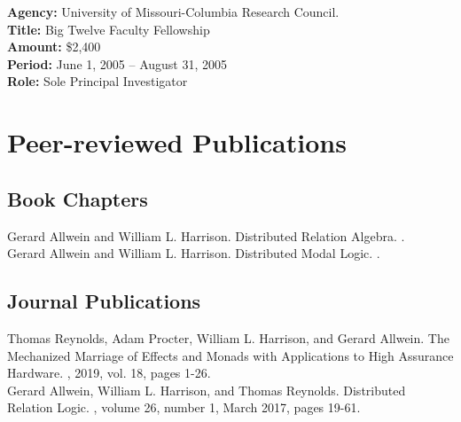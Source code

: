 \documentclass[12pt]{article} %
\begin{document}
{\bf Agency:} University of Missouri-Columbia Research Council.
\\
{\bf Title:} Big Twelve Faculty Fellowship
\\
{\bf Amount:} \$2,400
\\
{\bf Period:}   June 1, 2005  --  August 31, 2005 
\\
{\bf Role:}      Sole Principal Investigator
\\


\section*{Peer-reviewed Publications}

\subsection*{Book Chapters}

Gerard Allwein and William L. Harrison.
\newblock Distributed Relation Algebra.
.
\\

Gerard Allwein and William L. Harrison.
\newblock Distributed Modal Logic.
.

\subsection*{Journal Publications}


Thomas Reynolds, Adam Procter, William L. Harrison, and Gerard Allwein.
\newblock The Mechanized Marriage of Effects and Monads with Applications to High Assurance Hardware.
, 2019, vol. 18, pages 1-26. 
\\


Gerard Allwein, William L. Harrison, and Thomas Reynolds.
\newblock Distributed Relation Logic.
, volume 26, number 1, March 2017, pages 19-61.
\\
\end{document}
